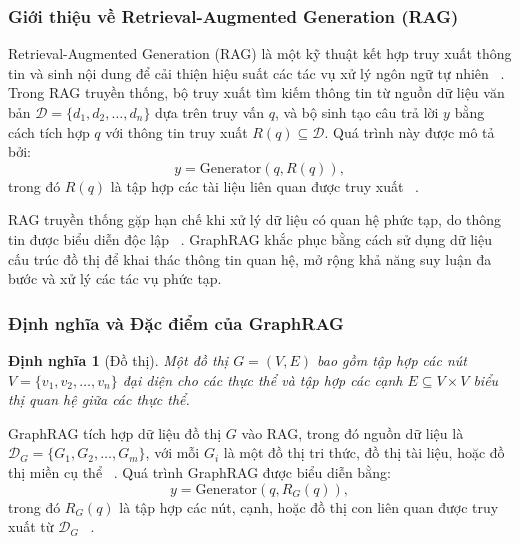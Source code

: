 \documentclass[a4paper]{article}
\newtheorem{definition}{Định nghĩa}
\begin{document}
\subsubsection{Giới thiệu về Retrieval-Augmented Generation (RAG)}
Retrieval-Augmented Generation (RAG) là một kỹ thuật kết hợp truy xuất thông tin và sinh nội dung để cải thiện hiệu suất các tác vụ xử lý ngôn ngữ tự nhiên ~\cite{Lewis2020RAG}. Trong RAG truyền thống, bộ truy xuất tìm kiếm thông tin từ nguồn dữ liệu văn bản $\mathcal{D} = \{d_1, d_2, \dots, d_n\}$ dựa trên truy vấn $q$, và bộ sinh tạo câu trả lời $y$ bằng cách tích hợp $q$ với thông tin truy xuất $R(q) \subseteq \mathcal{D}$. Quá trình này được mô tả bởi:
\begin{equation}
    y = \text{Generator}(q, R(q)),
\end{equation}
trong đó $R(q)$ là tập hợp các tài liệu liên quan được truy xuất ~\cite{Raffel2020T5}.

RAG truyền thống gặp hạn chế khi xử lý dữ liệu có quan hệ phức tạp, do thông tin được biểu diễn độc lập ~\cite{Chen2024GraphRAG}. GraphRAG khắc phục bằng cách sử dụng dữ liệu cấu trúc đồ thị để khai thác thông tin quan hệ, mở rộng khả năng suy luận đa bước và xử lý các tác vụ phức tạp.

\subsubsection{Định nghĩa và Đặc điểm của GraphRAG}
\begin{definition}[Đồ thị]
Một đồ thị $G = (V, E)$ bao gồm tập hợp các nút $V = \{v_1, v_2, \dots, v_n\}$ đại diện cho các thực thể và tập hợp các cạnh $E \subseteq V \times V$ biểu thị quan hệ giữa các thực thể.
\end{definition}

GraphRAG tích hợp dữ liệu đồ thị $G$ vào RAG, trong đó nguồn dữ liệu là $\mathcal{D}_G = \{G_1, G_2, \dots, G_m\}$, với mỗi $G_i$ là một đồ thị tri thức, đồ thị tài liệu, hoặc đồ thị miền cụ thể ~\cite{Liu2023GraphSurvey}. Quá trình GraphRAG được biểu diễn bằng:
\begin{equation}
    y = \text{Generator}(q, R_G(q)),
\end{equation}
trong đó $R_G(q)$ là tập hợp các nút, cạnh, hoặc đồ thị con liên quan được truy xuất từ $\mathcal{D}_G$ ~\cite{Chen2024GraphRAG}.
\end{document}

